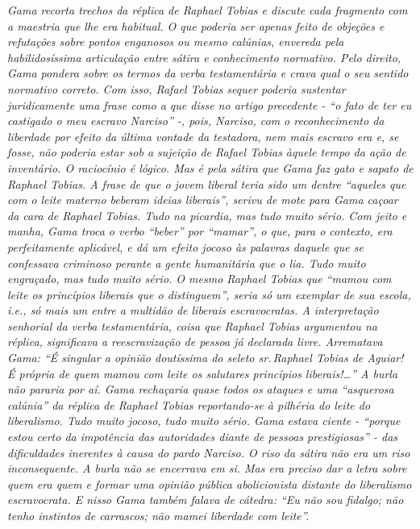 \begin{didascalia}
\emph{Gama recorta trechos da réplica de Raphael Tobias e discute cada
fragmento com a maestria que lhe era habitual. O que poderia ser apenas
feito de objeções e refutações sobre pontos enganosos ou mesmo calúnias,
envereda pela habilidosíssima articulação entre sátira e conhecimento
normativo. Pelo direito, Gama pondera sobre os termos da verba
testamentária e crava qual o seu sentido normativo correto. Com isso,
Rafael Tobias sequer poderia sustentar juridicamente uma frase como a
que disse no artigo precedente - ``o fato de ter eu castigado o meu
escravo Narciso'' -, pois, Narciso, com o reconhecimento da liberdade por
efeito da última vontade da testadora, nem mais escravo era e, se fosse,
não poderia estar sob a sujeição de Rafael Tobias àquele tempo da ação
de inventário. O raciocínio é lógico. Mas é pela sátira que Gama faz
gato e sapato de Raphael Tobias. A frase de que o jovem liberal teria
sido um dentre ``aqueles que com o leite materno beberam ideias
liberais'', serivu de mote para Gama caçoar da cara de Raphael Tobias.
Tudo na picardia, mas tudo muito sério. Com jeito e manha, Gama troca o
verbo ``beber'' por ``mamar'', o que, para o contexto, era perfeitamente
aplicável, e dá um efeito jocoso às palavras daquele que se confessava
criminoso perante a gente humanitária que o lia. Tudo muito engraçado,
mas tudo muito sério. O mesmo Raphael Tobias que ``mamou com leite os
princípios liberais que o distinguem'', seria só um exemplar de sua
escola, i.e., só mais um entre a multidão de liberais escravocratas. A
interpretação senhorial da verba testamentária, coisa que Raphael Tobias
argumentou na réplica, significava a reescravização de pessoa já
declarada livre. Arrematava Gama: ``É singular a opinião doutíssima do
seleto sr.\,Raphael Tobias de Aguiar! É própria de quem mamou com leite
os salutares princípios liberais!\ldots'' A burla não pararia por aí.
Gama rechaçaria quase todos os ataques e uma ``asquerosa calúnia'' da
réplica de Raphael Tobias reportando-se à pilhéria do leite do
liberalismo. Tudo muito jocoso, tudo muito sério. Gama estava ciente -
``porque estou certo da impotência das autoridades diante de pessoas
prestigiosas'' - das dificuldades inerentes à causa do pardo Narciso. O
riso da sátira não era um riso inconsequente. A burla não se encerrava
em si. Mas era preciso dar a letra sobre quem era quem e formar uma
opinião pública abolicionista distante do liberalismo escravocrata. E
nisso Gama também falava de cátedra: ``Eu não sou fidalgo; não tenho
instintos de carrascos; não mamei liberdade com leite''.}
\end{didascalia}


